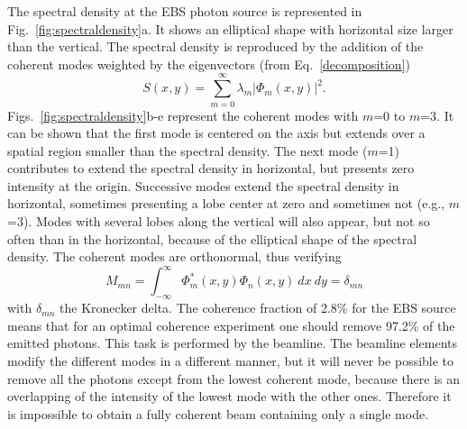 \documentclass{iucr}              %
\begin{document}
The spectral density at the EBS photon source is represented in Fig.~\ref{fig:spectraldensity}a. It shows an elliptical shape with horizontal size larger than the vertical.  The spectral density is reproduced by the addition of the coherent modes weighted by the eigenvectors (from Eq.~\ref{decomposition})
\begin{equation}
S(x,y) = \sum_{m=0}^{\infty} \lambda_m |\Phi_m(x,y)|^2.
\end{equation}
Figs.~\ref{fig:spectraldensity}b-e represent the coherent modes with $m$=0 to $m$=3. It can be shown that the first mode is centered on the axis but extends over a spatial region smaller than the spectral density. The next mode ($m$=1) contributes to extend the spectral density in horizontal, but presents zero intensity at the origin. Successive modes extend  the spectral density in horizontal, sometimes presenting a lobe center at zero and sometimes not (e.g., $m$=3). Modes with several lobes along the vertical will also appear, but not so often than in the horizontal, because of the elliptical shape of the spectral density. The coherent modes are orthonormal, thus verifying 
\begin{equation}\label{eq:mode normalization}
M_{mn} = \int_{-\infty}^{\infty} \Phi^*_m(x,y) \Phi_n(x,y)~dx~dy = \delta_{mn}
\end{equation}
with $\delta_{mn}$ the Kronecker delta. The coherence fraction of 2.8\% for the EBS source means that for an optimal coherence experiment one should remove 97.2\% of the emitted photons. This task is performed by the beamline. The beamline elements modify the different modes in a different manner, but it will never be possible to remove all the photons except from the lowest coherent mode, because there is an overlapping of the intensity of the lowest mode with the other ones. Therefore it is impossible to obtain a fully coherent beam containing only a single mode. 
\end{document}

